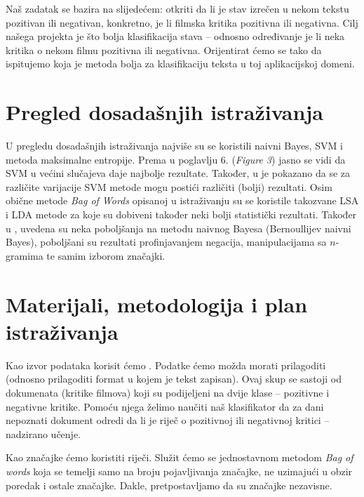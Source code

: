 \documentclass[12pt,a4paper,titlepage]{article}
\begin{document}
Naš zadatak se bazira na slijedećem: otkriti da li je stav izrečen u  nekom tekstu pozitivan ili negativan, konkretno, je li filmska kritika pozitivna ili negativna. Cilj našega projekta je što bolja klasifikacija stava -- odnosno određivanje je li neka kritika o nekom filmu pozitivna ili negativna. Orijentirat ćemo se tako da ispitujemo koja je metoda bolja za klasifikaciju teksta u toj aplikacijskoj domeni.\\

\section{Pregled dosadašnjih istraživanja}

U pregledu dosadašnjih istraživanja najviše su se koristili naivni Bayes, SVM i metoda maksimalne entropije. Prema \cite{Pang:2002:TUS:1118693.1118704} u poglavlju 6. (\textit{Figure 3}) jasno se vidi da SVM u većini slučajeva daje najbolje rezultate. Također, u  \cite{stan} je pokazano da se za različite varijacije SVM metode mogu postići različiti (bolji) rezultati. Osim obične metode \textit{Bag of Words} opisanoj u istraživanju \cite{maas-EtAl:2011:ACL-HLT2011} su se koristile takozvane \textsc{LSA} i \textsc{LDA} metode za koje su dobiveni također neki bolji statistički rezultati. Također u \cite{SaLAD:LAS}, uvedena su neka poboljšanja na metodu naivnog Bayesa (Bernoullijev naivni Bayes), poboljšani su rezultati profinjavanjem negacija, manipulacijama sa $n$-gramima te samim izborom značajki.

\section{Materijali, metodologija i plan istraživanja}

Kao izvor podataka korisit ćemo \cite{dataset}. Podatke ćemo možda morati prilagoditi (odnosno prilagoditi format u kojem je tekst zapisan). Ovaj skup se sastoji od dokumenata (kritike filmova) koji su podijeljeni na dvije klase -- pozitivne i negativne kritike. Pomoću njega želimo naučiti naš klasifikator da za dani nepoznati dokument odredi da li je riječ o pozitivnoj ili negativnoj kritici -- nadzirano učenje.

Kao značajke ćemo koristiti riječi. Služit ćemo se jednostavnom metodom \textit{Bag of words} koja se temelji samo na broju pojavljivanja značajke, ne uzimajući u obzir poredak i ostale značajke. Dakle, pretpostavljamo da su značajke nezavisne.
\end{document}

